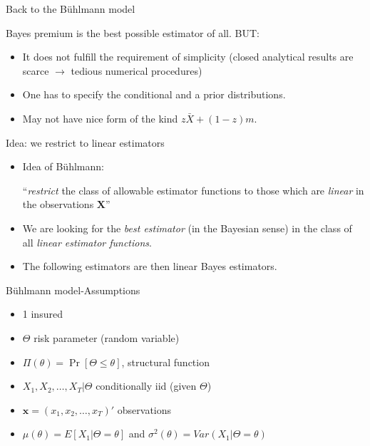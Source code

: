 \documentclass[11pt]{beamer}
\begin{document}
\begin{frame}{Back to the B\"uhlmann model}

Bayes premium is the best possible estimator of all. BUT:

\vfill
\begin{itemize}
\item It does not fulfill the requirement of simplicity (closed analytical results are scarce $\longrightarrow$ tedious numerical procedures)

\vfill

\item One has to specify the conditional and a prior distributions.

\vfill

\item May not have nice form of the kind $z\bar{X}+(1-z)m$.
\end{itemize}


\end{frame}
\begin{frame}{Idea: we restrict to linear estimators}

\begin{itemize}

\item Idea of B\"uhlmann: \\

\begin{center}
``\emph{\alert{restrict}} the class of allowable estimator functions to those which are \alert{\emph{linear}} in the observations $\mathbf{X}$'' 
\end{center}

\vfill

\item We are looking for the \alert{\emph{best estimator}} (in the Bayesian sense) in the class of all \emph{linear estimator functions}. 

\vfill

\item The following estimators are then \alert{linear Bayes estimators}.

\end{itemize}

\end{frame}
\begin{frame}{B\"uhlmann model-Assumptions}

\begin{itemize}
\item 1 insured
\item $\Theta$ risk parameter (random variable)
\item $\Pi(\theta)=\Pr [\Theta\le \theta]$, structural function
\item $X_1,X_2,\ldots,X_T | \Theta$ conditionally iid (given $\Theta$)
\item $\mathbf{x}=(x_1,x_2,\ldots,x_T)'$ observations
\item $\mu(\theta)=E[X_1|\Theta=\theta]$ and $\sigma^2(\theta)=Var(X_1|\Theta=\theta)$
\end{itemize}

\end{frame}
\end{document}
